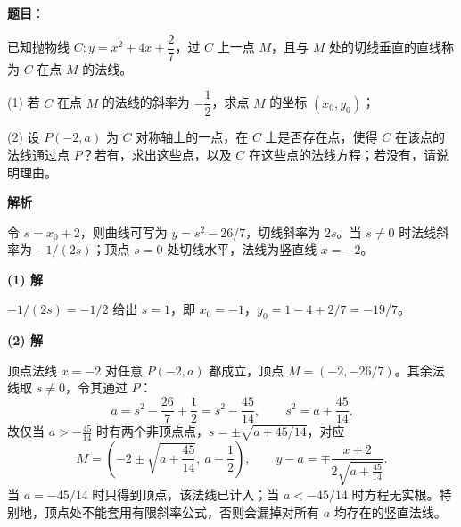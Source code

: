 \begin{answer}

\textbf{题目}：

已知抛物线 $C:y=x^2+4x+\dfrac{2}{7}$，过 $C$ 上一点 $M$，且与 $M$ 处的切线垂直的直线称为 $C$ 在点 $M$ 的法线。

(1) 若 $C$ 在点 $M$ 的法线的斜率为 $-\dfrac{1}{2}$，求点 $M$ 的坐标 $(x_0,y_0)$；

(2) 设 $P(-2,a)$ 为 $C$ 对称轴上的一点，在 $C$ 上是否存在点，使得 $C$ 在该点的法线通过点 $P$？若有，求出这些点，以及 $C$ 在这些点的法线方程；若没有，请说明理由。

\textbf{解析}

令 $s=x_0+2$，则曲线可写为 $y=s^2-26/7$，切线斜率为 $2s$。当 $s\ne0$ 时法线斜率为 $-1/(2s)$；顶点 $s=0$ 处切线水平，法线为竖直线 $x=-2$。

\textbf{(1) 解}

$-1/(2s)=-1/2$ 给出 $s=1$，即 $x_0=-1$，$y_0=1-4+2/7=-19/7$。

\textbf{(2) 解}

顶点法线 $x=-2$ 对任意 $P(-2,a)$ 都成立，顶点 $M=(-2,-26/7)$。其余法线取 $s\ne0$，令其通过 $P$：
\nopagebreak[4]
\[
a=s^2-\frac{26}{7}+\frac12=s^2-\frac{45}{14},
\qquad s^2=a+\frac{45}{14}.
\]
故仅当 $a>-\frac{45}{14}$ 时有两个非顶点点，$s=\pm\sqrt{a+45/14}$，对应
\nopagebreak[4]
\[
M=\left(-2\pm\sqrt{a+\frac{45}{14}},\ a-\frac12\right),\qquad
y-a=\mp\frac{x+2}{2\sqrt{a+\frac{45}{14}}}.
\]
当 $a=-45/14$ 时只得到顶点，该法线已计入；当 $a<-45/14$ 时方程无实根。特别地，顶点处不能套用有限斜率公式，否则会漏掉对所有 $a$ 均存在的竖直法线。



\end{answer}